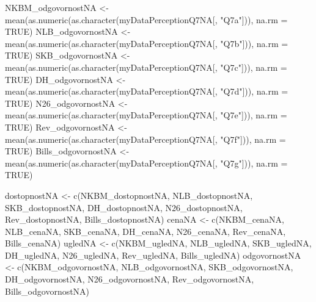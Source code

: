 \documentclass[
]{article}
\newenvironment{Shaded}{\begin{snugshade}}{\end{snugshade}}
\newcommand{\AttributeTok}[1]{\textcolor[rgb]{0.77,0.63,0.00}{#1}}
\newcommand{\ConstantTok}[1]{\textcolor[rgb]{0.00,0.00,0.00}{#1}}
\newcommand{\FunctionTok}[1]{\textcolor[rgb]{0.00,0.00,0.00}{#1}}
\newcommand{\NormalTok}[1]{#1}
\newcommand{\OtherTok}[1]{\textcolor[rgb]{0.56,0.35,0.01}{#1}}
\newcommand{\StringTok}[1]{\textcolor[rgb]{0.31,0.60,0.02}{#1}}
\begin{document}
\begin{Shaded}
\begin{Highlighting}[]
\NormalTok{NKBM\_odgovornostNA }\OtherTok{\textless{}{-}} \FunctionTok{mean}\NormalTok{(}\FunctionTok{as.numeric}\NormalTok{(}\FunctionTok{as.character}\NormalTok{(myDataPerceptionQ7NA[, }\StringTok{"Q7a"}\NormalTok{])), }\AttributeTok{na.rm =} \ConstantTok{TRUE}\NormalTok{)}
\NormalTok{NLB\_odgovornostNA }\OtherTok{\textless{}{-}} \FunctionTok{mean}\NormalTok{(}\FunctionTok{as.numeric}\NormalTok{(}\FunctionTok{as.character}\NormalTok{(myDataPerceptionQ7NA[, }\StringTok{"Q7b"}\NormalTok{])), }\AttributeTok{na.rm =} \ConstantTok{TRUE}\NormalTok{)}
\NormalTok{SKB\_odgovornostNA }\OtherTok{\textless{}{-}} \FunctionTok{mean}\NormalTok{(}\FunctionTok{as.numeric}\NormalTok{(}\FunctionTok{as.character}\NormalTok{(myDataPerceptionQ7NA[, }\StringTok{"Q7c"}\NormalTok{])), }\AttributeTok{na.rm =} \ConstantTok{TRUE}\NormalTok{)}
\NormalTok{DH\_odgovornostNA }\OtherTok{\textless{}{-}} \FunctionTok{mean}\NormalTok{(}\FunctionTok{as.numeric}\NormalTok{(}\FunctionTok{as.character}\NormalTok{(myDataPerceptionQ7NA[, }\StringTok{"Q7d"}\NormalTok{])), }\AttributeTok{na.rm =} \ConstantTok{TRUE}\NormalTok{)}
\NormalTok{N26\_odgovornostNA }\OtherTok{\textless{}{-}} \FunctionTok{mean}\NormalTok{(}\FunctionTok{as.numeric}\NormalTok{(}\FunctionTok{as.character}\NormalTok{(myDataPerceptionQ7NA[, }\StringTok{"Q7e"}\NormalTok{])), }\AttributeTok{na.rm =} \ConstantTok{TRUE}\NormalTok{)}
\NormalTok{Rev\_odgovornostNA }\OtherTok{\textless{}{-}} \FunctionTok{mean}\NormalTok{(}\FunctionTok{as.numeric}\NormalTok{(}\FunctionTok{as.character}\NormalTok{(myDataPerceptionQ7NA[, }\StringTok{"Q7f"}\NormalTok{])), }\AttributeTok{na.rm =} \ConstantTok{TRUE}\NormalTok{)}
\NormalTok{Bills\_odgovornostNA }\OtherTok{\textless{}{-}} \FunctionTok{mean}\NormalTok{(}\FunctionTok{as.numeric}\NormalTok{(}\FunctionTok{as.character}\NormalTok{(myDataPerceptionQ7NA[, }\StringTok{"Q7g"}\NormalTok{])), }\AttributeTok{na.rm =} \ConstantTok{TRUE}\NormalTok{)}

\NormalTok{dostopnostNA }\OtherTok{\textless{}{-}} \FunctionTok{c}\NormalTok{(NKBM\_dostopnostNA, NLB\_dostopnostNA, SKB\_dostopnostNA, DH\_dostopnostNA, N26\_dostopnostNA, Rev\_dostopnostNA, Bills\_dostopnostNA)}
\NormalTok{cenaNA }\OtherTok{\textless{}{-}} \FunctionTok{c}\NormalTok{(NKBM\_cenaNA, NLB\_cenaNA, SKB\_cenaNA, DH\_cenaNA, N26\_cenaNA, Rev\_cenaNA, Bills\_cenaNA)}
\NormalTok{ugledNA }\OtherTok{\textless{}{-}} \FunctionTok{c}\NormalTok{(NKBM\_ugledNA, NLB\_ugledNA, SKB\_ugledNA, DH\_ugledNA, N26\_ugledNA, Rev\_ugledNA, Bills\_ugledNA)}
\NormalTok{odgovornostNA }\OtherTok{\textless{}{-}} \FunctionTok{c}\NormalTok{(NKBM\_odgovornostNA, NLB\_odgovornostNA, SKB\_odgovornostNA, DH\_odgovornostNA, N26\_odgovornostNA, Rev\_odgovornostNA, Bills\_odgovornostNA)}


\end{Highlighting}
\end{Shaded}
\end{document}
